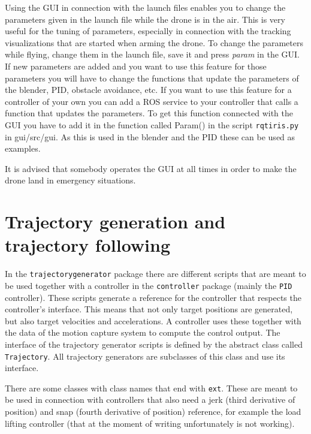 \documentclass[titlepage,11pt,a4paper]{article}
\begin{document}
Using the GUI in connection with the launch files enables you to
change the parameters given in the launch file while the drone is in
the air. This is very useful for the tuning of parameters, especially
in connection with the tracking visualizations that are started when
arming the drone. To change the parameters while flying, change them
in the launch file, save it and press \textit{param} in the GUI. If new
parameters are added and you want to use this feature for those
parameters you will have to change the functions that update the
parameters of the blender, PID, obstacle avoidance, etc. If you want
to use this feature for a controller of your own you can add a ROS
service to your controller that calls a function that updates the
parameters. To get this function connected with the GUI you have to
add it in the function called Param() in the script
\texttt{rqt\textunderscore iris.py} in gui/src/gui. As this is used in
the blender and the PID these can be used as examples.

It is advised that somebody operates the GUI at all times in order to
make the drone land in emergency situations.


\section{Trajectory generation and trajectory following}
\label{sec:trajectory}

In the \texttt{trajectory\textunderscore generator} package there are
different scripts that are meant to be used together with a controller
in the \texttt{controller} package (mainly the \texttt{PID}
controller). These scripts generate a reference for the controller
that respects the controller's interface. This means that not only
target positions are generated, but also target velocities and
accelerations. A controller uses these together with the data of the
motion capture system to compute the control output. The interface of
the trajectory generator scripts is defined by the abstract class
called \texttt{Trajectory}. All trajectory generators are subclasses
of this class and use its interface.

There are some classes with class names that end with
\texttt{\textunderscore ext}. These are meant to be used in connection
with controllers that also need a jerk (third derivative of position)
and snap (fourth derivative of position) reference, for example the load
lifting controller (that at the moment of writing unfortunately is not
working).
\end{document}
